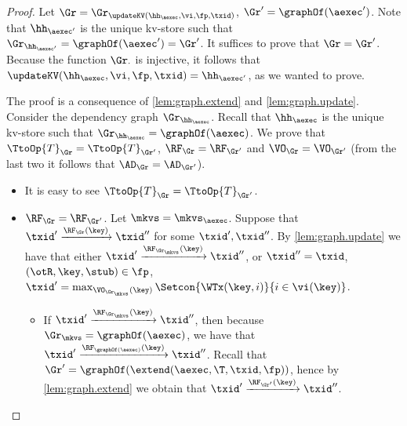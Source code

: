 \begin{proof}
Let $\Gr = \Gr_{\updateKV(\hh_{\aexec}, \vi, \fp, \txid)}$, $\Gr' = \graphOf(\aexec')$. 
Note that $\hh_{\aexec'}$ is the unique kv-store such that $\Gr_{\hh_{\aexec'}} = \graphOf(\aexec') = \Gr'$. 
It suffices to prove that $\Gr = \Gr'$. Because the function $\Gr_{\cdot}$ is injective, it follows that 
$\updateKV(\hh_{\aexec}, \vi, \fp, \txid) = \hh_{\aexec'}$, as we wanted to prove.  

The proof is a consequence of \cref{lem:graph.extend} and \cref{lem:graph.update}. 
Consider the dependency graph $\Gr_{\hh_{\aexec}}$.
Recall that $\hh_{\aexec}$ is the unique kv-store such that $\Gr_{\hh_{\aexec}} = \graphOf(\aexec)$. 
We prove that $\TtoOp{T}_{\Gr} = \TtoOp{T}_{\Gr'}$, $\RF_{\Gr} = \RF_{\Gr'}$ and 
$\VO_{\Gr} = \VO_{\Gr'}$ (from the last two it follows that $\AD_{\Gr} = \AD_{\Gr'}$). 
\begin{itemize}
\item It is easy to see $\TtoOp{T}_{\Gr} = \TtoOp{T}_{\Gr'}$.

\item $\RF_{\Gr} = \RF_{\Gr'}$.
Let \( \mkvs  = \mkvs_\aexec \).
Suppose that $\txid' \xrightarrow{\RF_{\Gr}(\key)} \txid''$ for some $\txid', \txid''$. 
By \cref{lem:graph.update} we have that either $\txid' \xrightarrow{\RF_{\Gr_\mkvs}(\key)} \txid''$, 
or $\txid'' = \txid$, $(\otR, \key, \stub) \in \fp$, $\txid' = \max_{\VO_{\Gr_\mkvs}(\key)}\Setcon{\WTx(\key, i) }{ i \in \vi(\key)}$. 

\begin{itemize}
\item If $\txid' \xrightarrow{\RF_{\Gr_\mkvs}(\key)} \txid''$, then because 
$\Gr_\mkvs = \graphOf(\aexec)$, we have that $\txid' \xrightarrow{\RF_{\graphOf(\aexec)}(\key)} \txid''$. 
Recall that $\Gr' = \graphOf(\extend(\aexec, \T, \txid, \fp))$, hence by \cref{lem:graph.extend} 
we obtain that $\txid' \xrightarrow{\RF_{\Gr'}(\key)} \txid''$. 


\end{itemize}
\end{itemize}
\end{proof}

